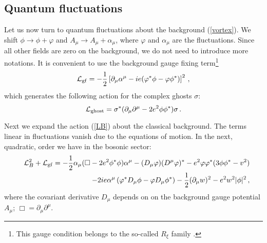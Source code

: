 \documentclass[a4paper,12pt]{article}
\begin{document}
\subsection{Quantum fluctuations}
Let us now turn to quantum fluctuations about the background
(\ref{vortex}). We shift $\phi \to \phi +\varphi$ and
$A_\mu \to A_\mu +\alpha_\mu$, where $\varphi$ and $\alpha_\mu$ are
the fluctuations. Since all other fields are zero on the background,
we do not need to introduce more notations. It is convenient
to use the background gauge fixing term\footnote{This gauge condition
belongs to the so-called $R_\xi$ family 
\cite{Rxigauge}.}
\begin{equation}
{\cal L}_{\rm gf}=-\frac 12 \left[ \partial_\mu \alpha^\mu 
-ie (\varphi^* \phi - \varphi \phi^*) \right]^2\,,\label{gfterm}
\end{equation}
which generates the following action for the complex ghosts $\sigma$:
\begin{equation}
{\cal L}_{\rm ghost}= \sigma^* ( \partial_\mu \partial^\mu 
-2e^2 \phi \phi^* )\sigma \,.\label{ghostac}
\end{equation}

Next we expand the action (\ref{LB}) about the classical background.
The terms linear in fluctuations vanish due to the equations of
motion. In the next, quadratic, order we have in the bosonic sector:
\begin{eqnarray}
&&{\cal L}_B^2 + {\cal L}_{\rm gf}=-\frac 12 \alpha_\mu 
(\Box -2e^2\phi^*\phi) \alpha^\mu
-(D_\mu \varphi )(D^\mu \varphi)^* -e^2 \varphi \varphi^*
(3\phi\phi^* -v^2) \nonumber\\
&& \qquad\qquad -2ie \alpha^\mu \left( \varphi^* D_\mu \phi -
\varphi D_\mu \phi^* \right) -\frac 12 (\partial_\mu w )^2 
-e^2 w^2 |\phi|^2 \,,\label{L2bos}
\end{eqnarray}
where the covariant derivative $D_\mu$ depends on 
on the background gauge potential $A_\mu$;
$\Box =\partial_\mu \partial^\mu$.
\end{document}
